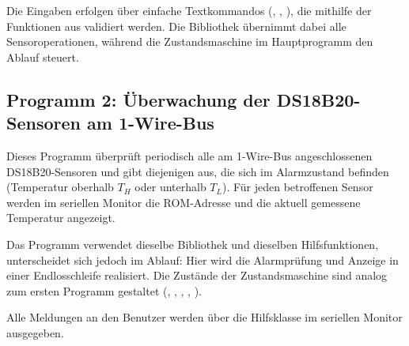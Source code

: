 	Die Eingaben erfolgen über einfache Textkommandos (, , ), die mithilfe der Funktionen aus  validiert werden. Die Bibliothek  übernimmt dabei alle Sensoroperationen, während die Zustandsmaschine im Hauptprogramm den Ablauf steuert.
	
	
	{
	}
	
	
\subsection{Programm 2: Überwachung der DS18B20-Sensoren am 1-Wire-Bus}
	Dieses Programm überprüft periodisch alle am 1-Wire-Bus angeschlossenen DS18B20-Sensoren und gibt diejenigen aus, 
	die sich im Alarmzustand befinden (Temperatur oberhalb $T_H$ oder unterhalb $T_L$). 
	Für jeden betroffenen Sensor werden im seriellen Monitor die ROM-Adresse und die aktuell gemessene Temperatur angezeigt.
	
	Das Programm verwendet dieselbe Bibliothek  und dieselben Hilfsfunktionen, unterscheidet sich jedoch im Ablauf: Hier wird die Alarmprüfung und Anzeige in einer Endlosschleife realisiert. Die Zustände der Zustandsmaschine sind analog zum ersten Programm gestaltet (, , , , ).
	
	Alle Meldungen an den Benutzer werden über die Hilfsklasse  im seriellen Monitor ausgegeben. 
	
	{
	}








